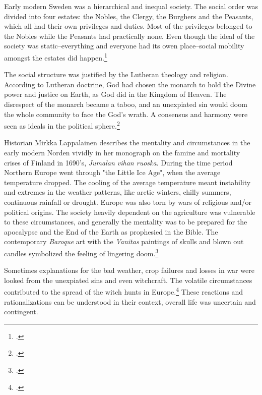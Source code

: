Early modern Sweden was a hierarchical and inequal society. The social order was divided into four estates: the Nobles, the Clergy, the Burghers and the Peasants, which all had their own privileges and duties. Most of the privileges belonged to the Nobles while the Peasants had practically none. Even though the ideal of the society was static–everything and everyone had its owen place–social mobility amongst the estates did happen.\footcites[pp. 21-23,]{hopesAndFearsIntro}[pp. 21-22.]{agencyAndStateBuilding} 

The social structure was justified by the Lutheran theology and religion. According to Lutheran doctrine, God had chosen the monarch to hold the Divine power and justice on Earth, as God did in the Kingdom of Heaven. The disrespect of the monarch became a taboo, and an unexpiated sin would doom the whole community to face the God's wrath. A consensus and harmony were seen as ideals in the political sphere.\footcites[pp. 24-28,]{hopesAndFearsIntro}[pp. 161-163.]{pSuurvalta}

Historian Mirkka Lappalainen describes the mentality and circumstances in the early modern Norden vividly in her monograph on the famine and mortality crises of Finland in 1690's, \textit{Jumalan vihan ruoska}. During the time period Northern Europe went through "the Little Ice Age", when the average temperature dropped. The cooling of the average temperature meant instability and extremes in the weather patterns, like arctic winters, chilly summers, continuous rainfall or drought. Europe was also torn by wars of religious and/or political origins. The society heavily dependent on the agriculture was vulnerable to these circumstances, and generally the mentality was to be prepared for the apocalypse and the End of the Earth as prophesied in the Bible. The contemporary \textit{Baroque} art with the \textit{Vanitas} paintings of skulls and blown out candles symbolized the feeling of lingering doom.\footcite[pp. 23-25.]{lappalainen12} 

Sometimes explanations for the bad weather, crop failures and losses in war were looked from the unexpiated sins and even witchcraft. The volatile circumstances contributed to the spread of the witch hunts in Europe.\footcite[pp. 23-29]{lappalainen12} These reactions and rationalizations can be understood in their context, overall life was uncertain and contingent. 

